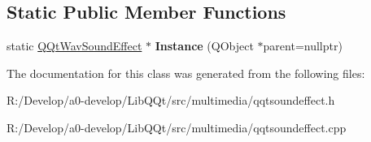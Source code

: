 \subsection*{Static Public Member Functions}
\begin{DoxyCompactItemize}
\item 
\mbox{\label{class_q_qt_wav_sound_effect_a019f7da974576d9c5c29841915dfa670}} 
static \mbox{\hyperlink{class_q_qt_wav_sound_effect}{Q\+Qt\+Wav\+Sound\+Effect}} $\ast$ {\bfseries Instance} (Q\+Object $\ast$parent=nullptr)
\end{DoxyCompactItemize}


The documentation for this class was generated from the following files\+:\begin{DoxyCompactItemize}
\item 
R\+:/\+Develop/a0-\/develop/\+Lib\+Q\+Qt/src/multimedia/qqtsoundeffect.\+h\item 
R\+:/\+Develop/a0-\/develop/\+Lib\+Q\+Qt/src/multimedia/qqtsoundeffect.\+cpp\end{DoxyCompactItemize}
